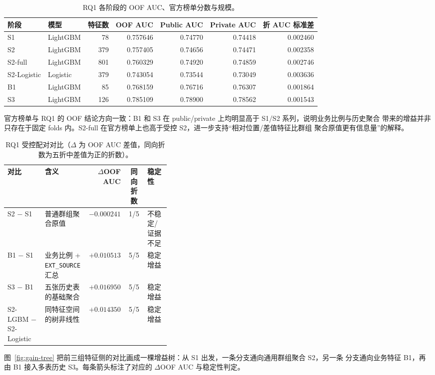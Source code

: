 \documentclass[11pt,UTF8,fontset=windows]{ctexrep}
\begin{document}
\begin{table}[h]
\centering
\caption{RQ1 各阶段的 OOF AUC、官方榜单分数与规模。}
\label{tab:rq1-stages}
\small
\setlength{\tabcolsep}{4pt}
\begin{tabular}{llrrrrr}
\toprule
阶段 & 模型 & 特征数 & OOF AUC & Public AUC & Private AUC & 折 AUC 标准差 \\
\midrule
S1 & LightGBM & 78 & 0.757646 & 0.74770 & 0.74418 & 0.002460 \\
S2 & LightGBM & 379 & 0.757405 & 0.74656 & 0.74471 & 0.002358 \\
S2-full & LightGBM & 801 & 0.760329 & 0.74920 & 0.74859 & 0.002746 \\
S2-Logistic & Logistic & 379 & 0.743054 & 0.73544 & 0.73049 & 0.003636 \\
B1 & LightGBM & 85 & 0.768159 & 0.76716 & 0.76307 & 0.001864 \\
S3 & LightGBM & 126 & 0.785109 & 0.78900 & 0.78562 & 0.001543 \\
\bottomrule
\end{tabular}
\end{table}

官方榜单与 RQ1 的 OOF 结论方向一致：B1 和 S3 在 public/private 上均明显高于 S1/S2 系列，说明业务比例与历史聚合
带来的增益并非只存在于固定 folds 内。S2-full 在官方榜单上也高于受控 S2，进一步支持“相对位置/差值特征比群组
聚合原值更有信息量”的解释。

\begin{table}[h]
\centering
\caption{RQ1 受控配对对比（$\Delta$ 为 OOF AUC 差值，同向折数为五折中差值为正的折数）。}
\label{tab:rq1-deltas}
\setlength{\tabcolsep}{4pt}
\begin{tabular}{l p{0.24\linewidth} r c p{0.14\linewidth}}
\toprule
对比 & 含义 & $\Delta$OOF AUC & 同向折数 & 稳定性 \\
\midrule
S2 $-$ S1 & 普通群组聚合原值 & $-0.000241$ & 1/5 & 不稳定/证据不足 \\
B1 $-$ S1 & 业务比例 + \texttt{EXT\_SOURCE} 汇总 & $+0.010513$ & 5/5 & 稳定增益 \\
S3 $-$ B1 & 五张历史表的基础聚合 & $+0.016950$ & 5/5 & 稳定增益 \\
S2-LGBM $-$ S2-Logistic & 同特征空间的树非线性 & $+0.014350$ & 5/5 & 稳定增益 \\
\bottomrule
\end{tabular}
\end{table}

图~\ref{fig:gain-tree} 把前三组特征侧的对比画成一棵增益树：从 S1 出发，一条分支通向通用群组聚合 S2，另一条
分支通向业务特征 B1，再由 B1 接入多表历史 S3。每条箭头标注了对应的 $\Delta$OOF AUC 与稳定性判定。
\end{document}
